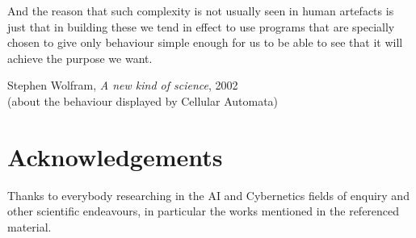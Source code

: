 \documentclass[14pt]{extarticle}
\begin{document}
\epigraph{
And the reason that such complexity is not usually seen in human artefacts is just that in building these we tend in effect to use programs that are specially chosen to give only behaviour simple enough for us to be able to see that it will achieve the purpose we want.}{Stephen Wolfram, \textit{A new kind of science}, 2002
\\(about the behaviour displayed by Cellular Automata)}



\section*{Acknowledgements}%
\label{sec:acknowledge}%
Thanks to everybody researching in the AI and Cybernetics fields of enquiry and other scientific endeavours, in particular the works mentioned in the referenced material.
\end{document}
